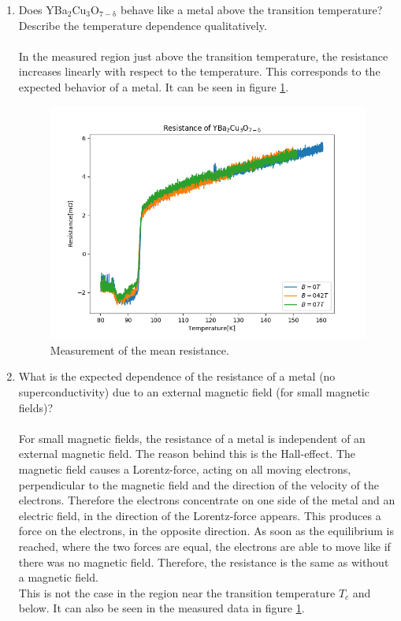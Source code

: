 \documentclass[a4paper,parskip,11pt, DIV12]{scrreprt}
\begin{document}
\begin{enumerate}

\item Does YBa$_2$Cu$_3$O$_{7-\mathrm{\delta}}$  behave like a metal above the transition temperature? Describe the temperature dependence qualitatively.\\
\\
In the measured region just above the transition temperature, the resistance increases linearly with respect to the temperature. This corresponds to the expected behavior of a metal. It can be seen in figure \ref{Res}.

\begin{figure}[H]
\centering
\includegraphics[scale=0.5]{Widerstand}
\caption[]{Measurement of the mean resistance.}
\label{Res}
\end{figure}
\hspace{0.1pt}

\item What is the expected dependence of the resistance of a metal (no superconductivity) due to an external magnetic field (for small magnetic fields)?\\
\\
For small magnetic fields, the resistance of a metal is independent of an external magnetic field. The reason behind this is the Hall-effect. The magnetic field causes a Lorentz-force, acting on all moving electrons, perpendicular to the magnetic field and the direction of the velocity of the electrons. Therefore the electrons concentrate on one side of the metal and an electric field, in the direction of the Lorentz-force appears. This produces a force on the electrons, in the opposite direction. As soon as the equilibrium is reached, where the two forces are equal, the electrons are able to move like if there was no magnetic field. Therefore, the resistance is the same as without a magnetic field. \\
This is not the case in the region near the transition temperature $T_c$ and below. It can also be seen in the measured data in figure \ref{Res}.


\end{enumerate}
\end{document}
